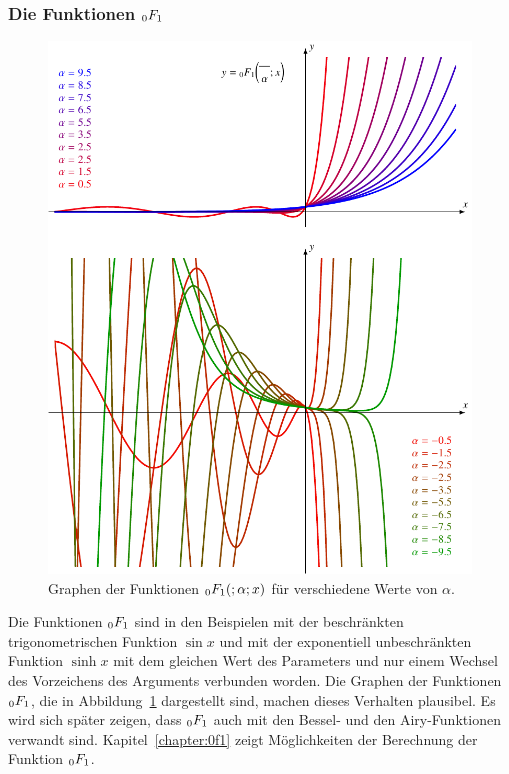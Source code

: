 \subsubsection{Die Funktionen $\mathstrut_0F_1$}
\begin{figure}
\centering
\includegraphics{chapters/040-rekursion/images/0f1.pdf}
\caption{Graphen der Funktionen $\mathstrut_0F_1(;\alpha;x)$ für
verschiedene Werte von $\alpha$.
\label{buch:rekursion:hypergeometrisch:0f1}}
\end{figure}
Die Funktionen $\mathstrut_0F_1$ sind in den Beispielen mit der
beschränkten trigonometrischen Funktion $\sin x$ und mit der
exponentiell unbeschränkten Funktion $\sinh x$ mit dem gleichen
Wert des Parameters und nur einem Wechsel des Vorzeichens des
Arguments verbunden worden.
Die Graphen der Funktionen $\mathstrut_0F_1$, die in 
Abbildung~\ref{buch:rekursion:hypergeometrisch:0f1} dargestellt sind,
machen dieses Verhalten plausibel.
Es wird sich später zeigen, dass $\mathstrut_0F_1$ auch mit den Bessel-
und den Airy-Funktionen verwandt sind.
Kapitel~\ref{chapter:0f1} zeigt Möglichkeiten der Berechnung der
Funktion $\mathstrut_0F_1$.


